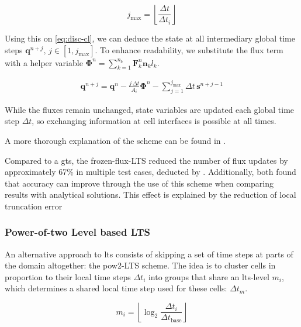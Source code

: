 \begin{equation}\label{eq:reuse-number}
	j_{\max} = \left\lfloor \frac{\Delta t}{\Delta t_i} \right\rfloor
\end{equation}

Using this on \autoref{eq:disc-cl}, we can deduce the state at all intermediary global time steps $\mathbf{q}^{n+j}, \, j \in [1,j_{\max}]$.
To enhance readability, we substitute the flux term with a helper variable $\boldsymbol\Phi^n = \sum_{k=1}^{n_b} \mathbf{F}_k^n \mathbf{n}_k l_k$.

\begin{equation}\label{eq:frozen-flux-LTS}
	\begin{aligned}
		\mathbf{q}^{n+j}
		= \mathbf{q}^n
		- \frac{j\, \Delta t}{A_i} \boldsymbol\Phi^n
		- \sum_{j=1}^{j_{\max}}
		\Delta t \, \mathbf{s}^{n+j-1}
	\end{aligned}
\end{equation}

While the fluxes remain unchanged, state variables are updated each global time step $\Delta t$, so exchanging information at cell interfaces is possible at all times.

A more thorough explanation of the scheme can be found in \textcite{zhang1994a}.

Compared to a \gls{gts}, the \gls{frozen-flux-LTS} reduced the number of flux updates by approximately 67\% in multiple test cases, deducted by \textcite{crossley2003}.
Additionally, both \textcite{crossley2003, zhang1994a} found that accuracy can improve through the use of this scheme when comparing results with analytical solutions.
This effect is explained by the reduction of local truncation error \autocite{crossley2003,zhang1994a}

\subsubsection{Power-of-two Level based LTS}

An alternative approach to \gls{lts} consists of skipping a set of time steps at parts of the domain altogether: the \acrfull{pow2-LTS} scheme.
The idea is to cluster cells in proportion to their local time steps $\Delta t_i$ into groups that share an \gls{lts}-level $m_i$, which determines a shared local time step used for these cells: $\Delta t_m$.

\begin{equation}\label{eq:pow2-lts-level}
	m_i = \left\lfloor
	\log_2 \frac{\Delta t_i}{\Delta t_{\mathrm{base}}}
	\right\rfloor
\end{equation}

